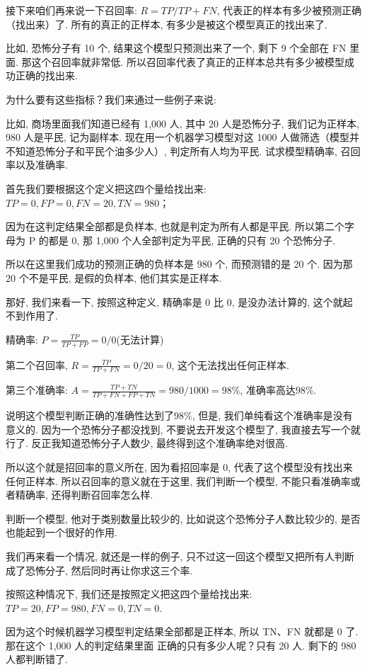 接下来咱们再来说一下召回率: $R=TP/TP+FN$, 代表正的样本有多少被预测正确（找出来）了. 所有的真正的正样本, 有多少是被这个模型真正的找出来了. 

比如, 恐怖分子有 10 个, 结果这个模型只预测出来了一个, 剩下 9 个全部在 FN 里面. 那这个召回率就非常低. 所以召回率代表了真正的正样本总共有多少被模型成功正确的找出来. 

为什么要有这些指标？我们来通过一些例子来说: 

比如, 商场里面我们知道已经有 1,000 人, 其中 20 人是恐怖分子, 我们记为正样本, 980 人是平民, 记为副样本. 现在用一个机器学习模型对这 1000 人做筛选（模型并不知道恐怖分子和平民个油多少人）, 判定所有人均为平民. 试求模型精确率, 召回率以及准确率. 

首先我们要根据这个定义把这四个量给找出来: $TP=0, FP=0, FN=20, TN=980$；

因为在这判定结果全部都是负样本, 也就是判定为所有人都是平民. 所以第二个字母为 P 的都是 0, 那 1,000 个人全部判定为平民, 正确的只有 20 个恐怖分子. 

所以在这里我们成功的预测正确的负样本是 980 个, 而预测错的是 20 个. 因为那 20 个不是平民, 是假的负样本, 他们其实是正样本. 

那好, 我们来看一下, 按照这种定义, 精确率是 0 比 0, 是没办法计算的, 这个就起不到作用了. 

精确率: $P=\frac{TP}{TP+FP} = 0/0$(无法计算)

第二个召回率, $R=\frac{TP}{TP+FN} = 0/20 = 0$, 这个无法找出任何正样本. 

第三个准确率: $A=\frac{TP+TN}{TP+FN+FP+TN} = 980/1000 = 98\%$, 准确率高达$98\%$. 

说明这个模型判断正确的准确性达到了$98\%$, 但是, 我们单纯看这个准确率是没有意义的. 因为一个恐怖分子都没找到, 不要说去开发这个模型了, 我直接去写一个就行了. 反正我知道恐怖分子人数少, 最终得到这个准确率绝对很高. 

所以这个就是招回率的意义所在, 因为看招回率是 0, 代表了这个模型没有找出来任何正样本. 所以召回率的意义就在于这里, 我们判断一个模型, 不能只看准确率或者精确率, 还得判断召回率怎么样. 

判断一个模型, 他对于类别数量比较少的, 比如说这个恐怖分子人数比较少的, 是否也能起到一个很好的作用. 

我们再来看一个情况, 就还是一样的例子, 只不过这一回这个模型又把所有人判断成了恐怖分子, 然后同时再让你求这三个率. 

按照这种情况下, 我们还是按照定义把这四个量给找出来: $TP=20, FP=980, FN=0, TN=0$. 

因为这个时候机器学习模型判定结果全部都是正样本, 所以 TN、FN 就都是 0 了. 那在这个 1,000 人的判定结果里面
正确的只有多少人呢？只有 20 人. 剩下的 980 人都判断错了. 

